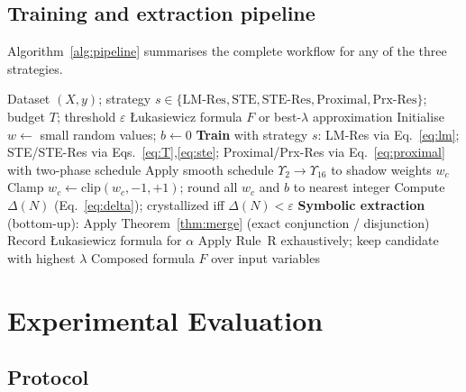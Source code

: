 \documentclass[lettersize,journal]{IEEEtran}
\newcommand{\LNN}{\L{}NN}
\begin{document}
\subsection{Training and extraction pipeline}
\label{ssec:pipeline}

Algorithm~\ref{alg:pipeline} summarises the complete workflow for any of the
three strategies.

\begin{algorithm}
\caption{\LNN{} training and symbolic extraction}
\label{alg:pipeline}
\begin{algorithmic}[1]
\REQUIRE Dataset $(X, y)$; strategy $s \in \{\mathrm{LM\text{-}Res},
         \mathrm{STE}, \mathrm{STE\text{-}Res},
         \mathrm{Proximal}, \mathrm{Prx\text{-}Res}\}$; budget $T$;
         threshold $\varepsilon$
\ENSURE \L{}ukasiewicz formula $F$ or best-$\lambda$ approximation
\STATE Initialise $w \leftarrow$ small random values; $b \leftarrow 0$
  \STATE \textbf{Train} with strategy $s$:
         LM-Res via Eq.~\eqref{eq:lm};
         STE/STE-Res via Eqs.~\eqref{eq:T},\eqref{eq:ste};
         Proximal/Prx-Res via Eq.~\eqref{eq:proximal} with two-phase schedule
    \STATE Apply smooth schedule $\Upsilon_2 \!\to\! \Upsilon_{16}$
           to shadow weights $w_c$
  \ENDIF
\ENDFOR
\STATE Clamp $w_c \leftarrow \mathrm{clip}(w_c, -1, +1)$; round all $w_c$
       and $b$ to nearest integer
\STATE Compute $\Delta(N)$ (Eq.~\eqref{eq:delta}); crystallized iff
       $\Delta(N) < \varepsilon$
\STATE \textbf{Symbolic extraction} (bottom-up):
    \STATE Apply Theorem~\ref{thm:merge} (exact conjunction / disjunction)
    \STATE Record \L{}ukasiewicz formula for $\alpha$
  \ELSE
    \STATE Apply Rule~R exhaustively; keep candidate with highest $\lambda$
  \ENDIF
\ENDFOR
\RETURN Composed formula $F$ over input variables
\end{algorithmic}
\end{algorithm}

\section{Experimental Evaluation}
\label{sec:experiments}

\subsection{Protocol}
\label{ssec:protocol}
\end{document}
